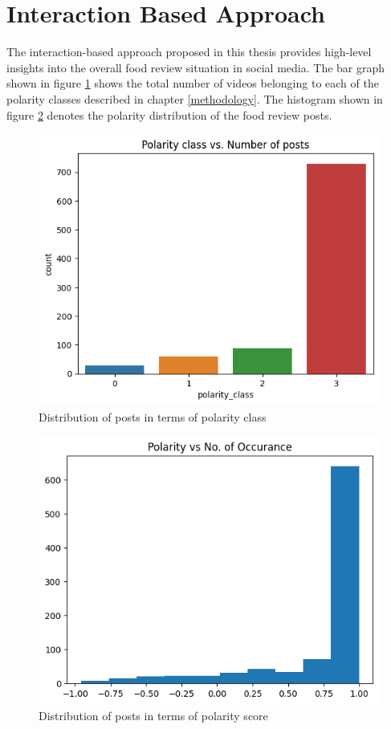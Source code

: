\section{Interaction Based Approach}
The interaction-based approach proposed in this thesis provides high-level insights into the overall food review situation in social media. The bar graph shown in figure \ref{fig_polarity_class} shows the total number of videos belonging to each of the polarity classes described in chapter \ref{methodology}. The histogram shown in figure \ref{fig_polarity_dist} denotes the polarity distribution of the food review posts.

\begin{figure}[H]
    \begin{center}
        \includegraphics[width=0.65 \linewidth]{figures/polarity_class_vs_count.png}
        \caption{Distribution of posts in terms of polarity class}
        \label{fig_polarity_class}
    \end{center}
\end{figure}

\begin{figure}[H]
    \begin{center}
        \includegraphics[width=0.65 \linewidth]{figures/polarity_distribution.png}
        \caption{Distribution of posts in terms of polarity score}
        \label{fig_polarity_dist}
    \end{center}
\end{figure}

